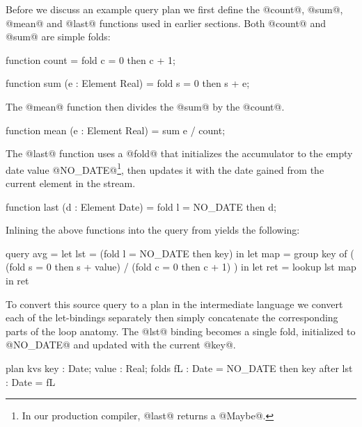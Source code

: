 Before we discuss an example query plan we first define the @count@, @sum@, @mean@ and @last@ functions used in earlier sections. Both @count@ and @sum@ are simple folds:
\begin{code}
    function count
     = fold c = 0 then c + 1;

    function sum (e : Element Real)
     = fold s = 0 then s + e;
\end{code}
The @mean@ function then divides the @sum@ by the @count@.
\begin{code}
    function mean (e : Element Real)
     = sum e / count;
\end{code}

The @last@ function uses a @fold@ that initializes the accumulator to the empty date value @NO_DATE@\footnote{In our production compiler, @last@ returns a @Maybe@.}, then updates it with the date gained from the current element in the stream.
\begin{code}
    function last (d : Element Date)
     = fold l = NO_DATE then d;
\end{code}


Inlining the above functions into the query from \label{s:ElementsAndAggregates} yields the following:
\begin{code}
  query avg
   =    let lst = (fold l = NO_DATE then key)
     in let map = group key of
                  ( (fold s = 0 then s + value)
                  / (fold c = 0 then c + 1) )
     in let ret = lookup lst map
     in     ret
\end{code}

To convert this source query to a plan in the intermediate language we convert each of the let-bindings separately then simply concatenate the corresponding parts of the loop anatomy. The @lst@ binding becomes a single fold, initialized to @NO_DATE@ and updated with the current @key@.
\begin{code}
  plan kvs { key : Date; value : Real;      }
  folds    { fL  : Date = NO_DATE then key  }
  after    { lst : Date = fL                }
\end{code}

